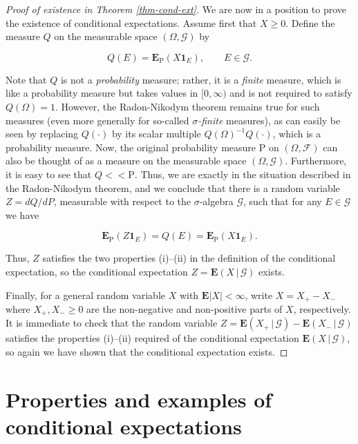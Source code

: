 \documentclass[11pt]{report}
\theoremstyle{plain}
\theoremstyle{definition}
\begin{document}
\begin{proof}[Proof of existence in Theorem \ref{thm-cond-ext}]
We are now in a position to prove the existence of conditional expectations. Assume first that $X\ge 0$. Define the measure $Q$ on the measurable space $(\Omega, \mathcal{G})$ by

\[
Q(E) = \mathbf{E}_{\mathrm{P}}(X \mathbf{1}_E), \qquad E\in\mathcal{G}.
\]

Note that $Q$ is not a \emph{probability} measure; rather, it is a \emph{finite} measure, which is like a probability measure but takes values in $[0,\infty)$ and is not required to satisfy $Q(\Omega)=1$. However, the Radon-Nikodym theorem remains true for such measures (even more generally for so-called \emph{$\sigma$-finite} measures), as can easily be seen by replacing $Q(\cdot)$ by its scalar multiple $Q(\Omega)^{-1} Q(\cdot)$, which is a probability measure. Now, the original probability measure $\mathrm{P}$ on $(\Omega, \mathcal{F})$ can also be thought of as a measure on the measurable space $(\Omega, \mathcal{G})$. Furthermore, it is easy to see that $Q << \mathrm{P}$. Thus, we are exactly in the situation described in the Radon-Nikodym theorem, and we conclude that there is a random variable $Z=dQ/dP$, measurable with respect to the $\sigma$-algebra $\mathcal{G}$, such that for any $E\in\mathcal{G}$ we have

\[
\mathbf{E}_{\mathrm{P}}(Z \mathbf{1}_E) = Q(E) = \mathbf{E}_{\mathrm{P}}(X \mathbf{1}_E).
\]

Thus, $Z$ satisfies the two properties (i)--(ii) in the definition of the conditional expectation, so the conditional expectation $Z=\mathbf{E}\left(X\,|\,\mathcal{G}\right)$ exists.

Finally, for a general random variable $X$ with $\mathbf{E}|X|<\infty$, write $X=X_+-X_-$ where $X_+, X_-\ge 0$ are the non-negative and non-positive parts of $X$, respectively. It is immediate to check that the random variable $Z = \mathbf{E}\left(X_+\,|\,\mathcal{G}\right) - \mathbf{E}\left(X_-\,|\,\mathcal{G}\right)$ satisfies the properties (i)--(ii) required of the conditional expectation $\mathbf{E}\left(X\,|\,\mathcal{G}\right)$, so again we have shown that the conditional expectation exists.
\end{proof}

\section{Properties and examples of conditional expectations}
\end{document}
